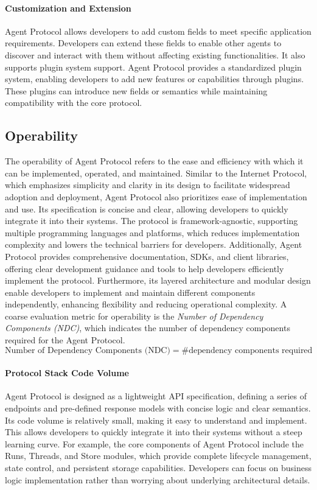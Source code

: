 \documentclass[10pt,preprint]{article}
\begin{document}
\paragraph{Customization and Extension} Agent Protocol allows developers to add custom fields to meet specific application requirements. Developers can extend these fields to enable other agents to discover and interact with them without affecting existing functionalities. It also supports plugin system support. Agent Protocol provides a standardized plugin system, enabling developers to add new features or capabilities through plugins. These plugins can introduce new fields or semantics while maintaining compatibility with the core protocol. 

\subsection{Operability}
The operability of Agent Protocol refers to the ease and efficiency with which it can be implemented, operated, and maintained. Similar to the Internet Protocol, which emphasizes simplicity and clarity in its design to facilitate widespread adoption and deployment, Agent Protocol also prioritizes ease of implementation and use. Its specification is concise and clear, allowing developers to quickly integrate it into their systems. The protocol is framework-agnostic, supporting multiple programming languages and platforms, which reduces implementation complexity and lowers the technical barriers for developers. Additionally, Agent Protocol provides comprehensive documentation, SDKs, and client libraries, offering clear development guidance and tools to help developers efficiently implement the protocol. Furthermore, its layered architecture and modular design enable developers to implement and maintain different components independently, enhancing flexibility and reducing operational complexity. A coarse evaluation metric for operability is the \textit{Number of Dependency Components (NDC)}, which indicates the number of dependency components required for the Agent Protocol.
\begin{equation}
    \text{Number of Dependency Components (NDC)}=\#\text{dependency components required}
\end{equation}

\paragraph{Protocol Stack Code Volume} Agent Protocol is designed as a lightweight API specification, defining a series of endpoints and pre-defined response models with concise logic and clear semantics. Its code volume is relatively small, making it easy to understand and implement. This allows developers to quickly integrate it into their systems without a steep learning curve. For example, the core components of Agent Protocol include the Runs, Threads, and Store modules, which provide complete lifecycle management, state control, and persistent storage capabilities. Developers can focus on business logic implementation rather than worrying about underlying architectural details.
\end{document}
